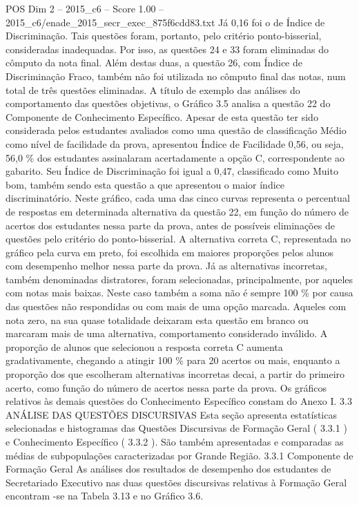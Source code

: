 \begin{textsample}{POS Dim 2 – 2015\_c6 – Score 1.00 – 2015\_c6/enade\_2015\_secr\_exec\_875f6cdd83.txt}
Já 0,16 foi o de Índice de Discriminação.
Tais questões foram, portanto, pelo critério ponto-bisserial, consideradas inadequadas.
Por isso, as questões 24 e 33 foram eliminadas do cômputo da nota final.
Além destas duas, a questão 26, com Índice de Discriminação Fraco, também não foi utilizada no cômputo final das notas, num total de três questões eliminadas.
A título de exemplo das análises do comportamento das questões objetivas, o Gráfico 3.5 analisa a questão 22 do Componente de Conhecimento Específico.
Apesar de esta questão ter sido considerada pelos estudantes avaliados como uma questão de classificação Médio como nível de facilidade da prova, apresentou Índice de Facilidade 0,56, ou seja, 56,0 \% dos estudantes assinalaram acertadamente a opção C, correspondente ao gabarito.
Seu Índice de Discriminação foi igual a 0,47, classificado como Muito bom, também sendo esta questão a que apresentou o maior índice discriminatório.
Neste gráfico, cada uma das cinco curvas representa o percentual de respostas em determinada alternativa da questão 22, em função do número de acertos dos estudantes nessa parte da prova, antes de possíveis eliminações de questões pelo critério do ponto-bisserial.
A alternativa correta C, representada no gráfico pela curva em preto, foi escolhida em maiores proporções pelos alunos com desempenho melhor nessa parte da prova.
Já as alternativas incorretas, também denominadas distratores, foram selecionadas, principalmente, por aqueles com notas mais baixas.
Neste caso também a soma não é sempre 100 \% por causa das questões não respondidas ou com mais de uma opção marcada.
Aqueles com nota zero, na sua quase totalidade deixaram esta questão em branco ou marcaram mais de uma alternativa, comportamento considerado inválido.
A proporção de alunos que selecionou a resposta correta C aumenta gradativamente, chegando a atingir 100 \% para 20 acertos ou mais, enquanto a proporção dos que escolheram alternativas incorretas decai, a partir do primeiro acerto, como função do número de acertos nessa parte da prova.
Os gráficos relativos às demais questões do Conhecimento Específico constam do Anexo I. 3.3 ANÁLISE DAS QUESTÕES DISCURSIVAS Esta seção apresenta estatísticas selecionadas e histogramas das Questões Discursivas de Formação Geral ( 3.3.1 ) e Conhecimento Específico ( 3.3.2 ).
São também apresentadas e comparadas as médias de subpopulações caracterizadas por Grande Região. 3.3.1 Componente de Formação Geral As análises dos resultados de desempenho dos estudantes de Secretariado Executivo nas duas questões discursivas relativas à Formação Geral encontram -se na Tabela 3.13 e no Gráfico 3.6.

\end{textsample}
